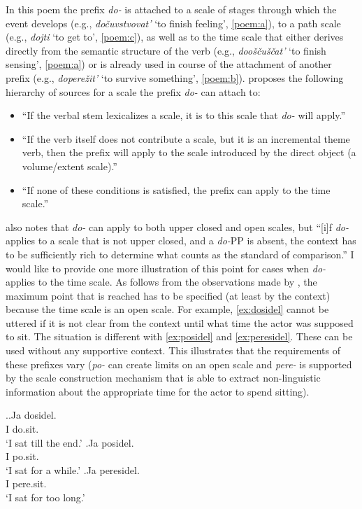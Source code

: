 In this poem the prefix \textit{do-} is attached to a scale of stages through which the event develops (e.g., \textit{do\v{c}uvstvovat'} `to finish feeling', \ref{poem:a}), to a path scale (e.g., \textit{dojti} `to get to', \ref{poem:c}), as well as to the time scale that either derives directly from the semantic structure of the verb (e.g., \textit{doo\v{s}\v{c}u\v{s}\v{c}at'} `to finish sensing', \ref{poem:a}) or is already used in course of the attachment of another prefix (e.g., \textit{dopere\v{z}it'} `to survive something', \ref{poem:b}). \citet{Kagan:book} proposes the following hierarchy of sources for a scale the prefix \textit{do-} can attach to: 

\begin{itemize}
\item ``If the verbal stem lexicalizes a scale, it is to this scale that \textit{do-} will apply.''
\item ``If the verb itself does not contribute a scale, but it is an incremental
theme verb, then the prefix will apply to the scale introduced by the direct object (a volume/extent scale).''
\item ``If none of these conditions is satisfied, the prefix can apply to the time scale.''
\end{itemize}

\citet{Kagan:12} also notes that \textit{do-} can apply to both upper closed and open scales, but ``[i]f \textit{do-} applies to a scale that is not upper closed, and a \textit{do-}PP is absent, the context has to be sufficiently rich to determine what counts as the standard of comparison.'' I would like to provide one more illustration of this point for cases when \textit{do-} applies to the time scale. As follows from the observations made by \citet{Kagan:12}, the maximum point that is reached has to be specified (at least by the context) because the time scale is an open scale. For example, \ref{ex:dosidel} cannot be uttered if it is not clear from the context until what time the actor was supposed to sit. The situation is different with \ref{ex:posidel} and \ref{ex:peresidel}. These can be used without any supportive context. This illustrates that the requirements of these prefixes vary (\textit{po-} can create limits on an open scale and \textit{pere-} is supported by the scale construction mechanism that is able to extract non-linguistic information about the appropriate time for the actor to spend sitting).

\ex.\ag.\label{ex:dosidel}Ja dosidel.\\
I do.sit.\\
\trans `I sat till the end.'
\bg.\label{ex:posidel}Ja posidel.\\
I po.sit.\\
\trans `I sat for a while.'
\bg.\label{ex:peresidel}Ja peresidel.\\
I pere.sit.\\
\trans `I sat for too long.'

